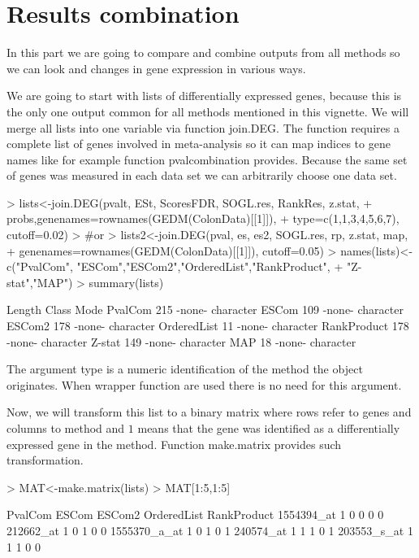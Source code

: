 \documentclass[a4paper]{report}
\begin{document}
\part{Results combination}
In this part we are going to compare and combine outputs from all methods so we can look and changes in gene expression in various ways. \par
We are going to start with lists of differentially expressed genes, because this is the only one output common for all methods mentioned in this vignette. We will merge all lists into one variable via function {\ttfamily join.DEG}. The function requires a complete list of genes involved in meta-analysis so it can map indices to gene names like for example function {\ttfamily pvalcombination} provides.  Because the same set of genes was measured in each data set we can arbitrarily choose one data set. 
\begin{Schunk}
\begin{Sinput}
> lists<-join.DEG(pvalt, ESt, ScoresFDR, SOGL.res, RankRes, z.stat, 
+  probs,genenames=rownames(GEDM(ColonData)[[1]]), 
+ type=c(1,1,3,4,5,6,7), cutoff=0.02)
> #or
> lists2<-join.DEG(pval, es, es2, SOGL.res, rp, z.stat, map,
+ genenames=rownames(GEDM(ColonData)[[1]]),  cutoff=0.05)
> names(lists)<-c("PvalCom", "ESCom","ESCom2","OrderedList","RankProduct", 
+ "Z-stat","MAP")
> summary(lists)
\end{Sinput}
\begin{Soutput}
            Length Class  Mode     
PvalCom     215    -none- character
ESCom       109    -none- character
ESCom2      178    -none- character
OrderedList  11    -none- character
RankProduct 178    -none- character
Z-stat      149    -none- character
MAP          18    -none- character
\end{Soutput}
\end{Schunk}
The argument {\ttfamily type} is a numeric identification of the method the object originates. When wrapper function are used there is no need for this argument.\par
Now, we will transform this list to a binary matrix where rows refer to genes and columns to method and $1$ means that the gene was identified as a differentially expressed gene in the method. Function {\ttfamily make.matrix} provides such transformation.  
\begin{Schunk}
\begin{Sinput}
> MAT<-make.matrix(lists)
> MAT[1:5,1:5]
\end{Sinput}
\begin{Soutput}
             PvalCom ESCom ESCom2 OrderedList RankProduct
1554394_at         1     0      0           0           0
212662_at          1     0      1           0           0
1555370_a_at       1     0      1           0           1
240574_at          1     1      1           0           1
203553_s_at        1     1      1           0           0
\end{Soutput}
\end{Schunk}
\end{document}
